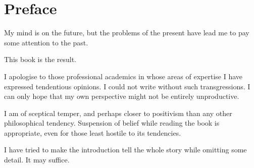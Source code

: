 \chapter*{Preface}


My mind is on the future, but the problems of the present have lead me to pay some attention to the past.

This book is the result.

I apologise to those professional academics in whose areas of expertise I have expressed tendentious opinions.
I could not write without such transgressions.
I can only hope that my own perspective might not be entirely unproductive.

I am of sceptical temper, and perhaps closer to positivism than any other philosophical tendency.
Suspension of belief while reading the book is appropriate, even for those least hostile to its tendencies.

I have tried to make the introduction tell the whole story while omitting some detail.
It may suffice.
